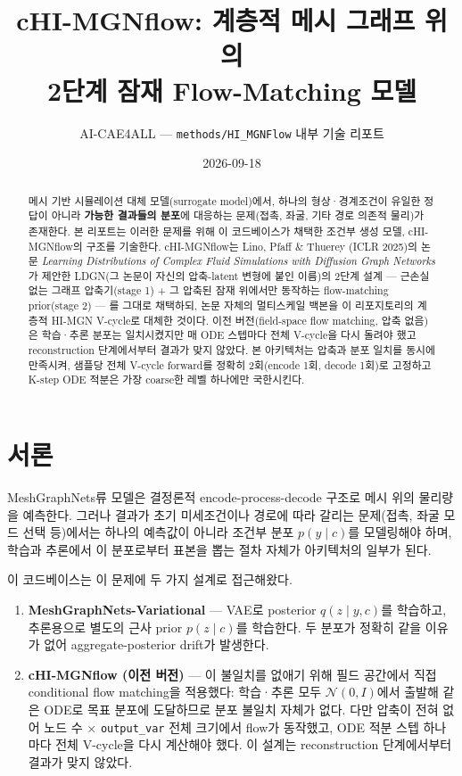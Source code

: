 \documentclass[11pt]{article}
\title{cHI-MGNflow: 계층적 메시 그래프 위의\\2단계 잠재 Flow-Matching 모델}
\author{AI-CAE4ALL --- \texttt{methods/HI\_MGNFlow} 내부 기술 리포트}
\date{2026-09-18}
\begin{document}
\maketitle

\begin{abstract}
메시 기반 시뮬레이션 대체 모델(surrogate model)에서, 하나의 형상·경계조건이
유일한 정답이 아니라 \textbf{가능한 결과들의 분포}에 대응하는 문제(접촉,
좌굴, 기타 경로 의존적 물리)가 존재한다. 본 리포트는 이러한 문제를 위해 이
코드베이스가 채택한 조건부 생성 모델, cHI-MGNflow의 구조를 기술한다.
cHI-MGNflow는 Lino, Pfaff \& Thuerey (ICLR 2025)의 논문 \textit{Learning
Distributions of Complex Fluid Simulations with Diffusion Graph Networks}가
제안한 LDGN(그 논문이 자신의 압축-latent 변형에 붙인 이름)의 2단계 설계
--- 근손실 없는 그래프 압축기(stage 1)
+ 그 압축된 잠재 위에서만 동작하는 flow-matching prior(stage 2) --- 를
그대로 채택하되, 논문 자체의 멀티스케일 백본을 이 리포지토리의 계층적
HI-MGN V-cycle로 대체한 것이다. 이전 버전(field-space flow matching, 압축
없음)은 학습·추론 분포는 일치시켰지만 매 ODE 스텝마다 전체 V-cycle을 다시
돌려야 했고 reconstruction 단계에서부터 결과가 맞지 않았다. 본 아키텍처는
압축과 분포 일치를 동시에 만족시켜, 샘플당 전체 V-cycle forward를 정확히
2회(encode 1회, decode 1회)로 고정하고 K-step ODE 적분은 가장 coarse한
레벨 하나에만 국한시킨다.
\end{abstract}

\section{서론}

MeshGraphNets류 모델은 결정론적 encode-process-decode 구조로 메시 위의
물리량을 예측한다. 그러나 결과가 초기 미세조건이나 경로에 따라 갈리는
문제(접촉, 좌굴 모드 선택 등)에서는 하나의 예측값이 아니라 조건부 분포
$p(y\mid c)$를 모델링해야 하며, 학습과 추론에서 이 분포로부터 표본을 뽑는
절차 자체가 아키텍처의 일부가 된다.

이 코드베이스는 이 문제에 두 가지 설계로 접근해왔다.

\begin{enumerate}
\item \textbf{MeshGraphNets-Variational} --- VAE로 posterior $q(z\mid y,c)$를
  학습하고, 추론용으로 별도의 근사 prior $p(z\mid c)$를 학습한다. 두 분포가
  정확히 같을 이유가 없어 aggregate-posterior drift가 발생한다.
\item \textbf{cHI-MGNflow (이전 버전)} --- 이 불일치를 없애기 위해 필드
  공간에서 직접 conditional flow matching을 적용했다: 학습·추론 모두
  $\mathcal{N}(0,I)$에서 출발해 같은 ODE로 목표 분포에 도달하므로 분포
  불일치 자체가 없다. 다만 압축이 전혀 없어 노드 수 $\times$
  \texttt{output\_var} 전체 크기에서 flow가 동작했고, ODE 적분 스텝
  하나마다 전체 V-cycle을 다시 계산해야 했다. 이 설계는 reconstruction
  단계에서부터 결과가 맞지 않았다.
\end{enumerate}
\end{document}
